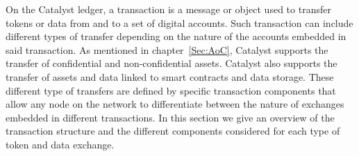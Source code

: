 On the Catalyst ledger, a transaction is a message or object used to transfer tokens or data from and to a set of digital accounts. Such transaction can include different types of transfer depending on the nature of the accounts embedded in said transaction. As mentioned in chapter~\ref{Sec:AoC}, Catalyst supports the transfer of confidential and non-confidential assets. Catalyst also supports the transfer of assets and data linked to smart contracts and data storage. These different type of transfers are defined by specific transaction components that allow any node on the network to differentiate between the nature of exchanges embedded in different transactions. In this section we give an overview of the transaction structure and the different components considered for each type of token and data exchange.  